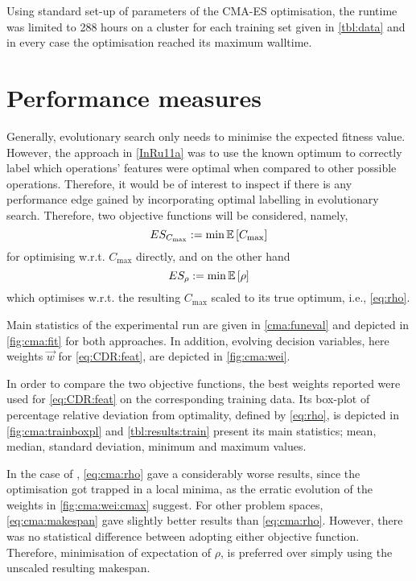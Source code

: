 Using standard set-up of parameters of the CMA-ES optimisation, the runtime was 
limited to 288 hours on a cluster for each training set given in 
\cref{tbl:data} and in every case the optimisation reached its maximum walltime.

\section{Performance measures}\label{sec:expr:measure}
Generally, evolutionary search only needs to minimise the expected fitness 
value. However, the  approach in \cref{InRu11a} was to use the known optimum to 
correctly label which operations' features were optimal when compared to other 
possible operations. Therefore, it would be of interest to inspect if there is 
any performance edge gained by incorporating optimal labelling in evolutionary 
search. Therefore, two objective functions will be considered, namely, 
\begin{equation}
	ES_{C_{\max}} := \min \Exp{C_{\max}} \label{eq:cma:makespan}
\end{equation}
for optimising w.r.t. $C_{\max}$ directly, and on the other hand
\begin{equation}
	ES_{\rho} := \min \Exp{\rho} \label{eq:cma:rho}
\end{equation} 
which optimises w.r.t. the resulting $C_{\max}$ scaled to its true optimum, 
i.e., \cref{eq:rho}.

Main statistics of the experimental run are given in \cref{cma:funeval} and 
depicted in \cref{fig:cma:fit} for both approaches. In addition, evolving 
decision variables, here weights $\vec{w}$ for \cref{eq:CDR:feat}, are 
depicted in \cref{fig:cma:wei}. 

In order to compare the two objective functions, the best weights reported were 
used for \cref{eq:CDR:feat} on the corresponding training data. Its 
box-plot of percentage relative deviation from optimality, defined by 
\cref{eq:rho}, is depicted in \cref{fig:cma:trainboxpl} and 
\cref{tbl:results:train} present its main statistics; mean, median, standard 
deviation, minimum and maximum values.

In the case of , \cref{eq:cma:rho} gave a considerably worse 
results, since the optimisation got trapped in a local minima, as the erratic 
evolution of the weights in \cref{fig:cma:wei:cmax} suggest.
For other problem spaces, \cref{eq:cma:makespan} gave slightly better results 
than \cref{eq:cma:rho}. However, there was no statistical difference between 
adopting either objective function. Therefore, minimisation of expectation of 
$\rho$, is preferred over simply using the unscaled resulting makespan. 

